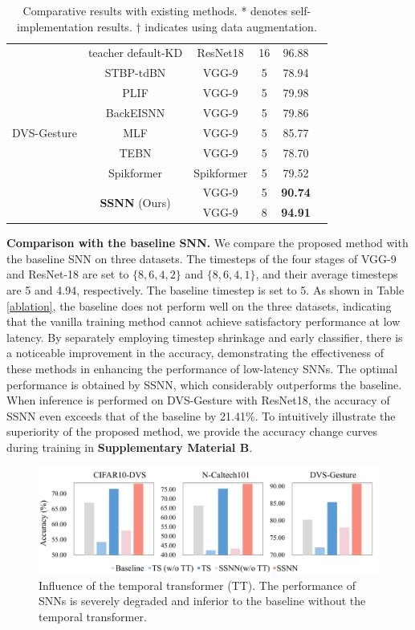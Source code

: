 \documentclass[letterpaper]{article} %
\begin{document}
\begin{table}[!tb]
\begin{threeparttable}
\begin{tabular}{cccccc}
  \hline
  \multirow{9}{*}{DVS-Gesture}
  &teacher default-KD \cite{KD} & ResNet18 & 16 & 96.88 \\
  \cline{2-5}
  & STBP-tdBN \cite{tdBN_2021} & VGG-9\tnote{*} & 5 & 78.94 \\
  & PLIF \cite{PLIF} & VGG-9\tnote{*} & 5 & 79.98 \\
  & BackEISNN \cite{BackEISNN} & VGG-9\tnote{*} & 5 & 79.86 \\
  & MLF \cite{MLF} & VGG-9\tnote{*} & 5 & 85.77 \\
  & TEBN \cite{TEBN} & VGG-9\tnote{*} & 5 & 78.70 \\
  &Spikformer \cite{Spikformer} & Spikformer\tnote{*} & 5 & 79.52 \\
  \cline{2-5}
  &\multirow{2}{*}{\textbf{SSNN} (Ours)}  & VGG-9 & 5 & \textbf{90.74} \\&& VGG-9 & 8 & \textbf{94.91}\\
  \bottomrule
 \end{tabular}
\end{threeparttable}
\caption{Comparative results with existing methods. * denotes self-implementation results. $\dag$ indicates using data augmentation.}
 \label{comparative }
\end{table}
\textbf{Comparison with the baseline SNN.} We compare the proposed method with the baseline SNN on three datasets. The timesteps of the four stages of VGG-9 and ResNet-18 are set to $\{8,6,4,2\}$ and $\{8,6,4,1\}$, and their average timesteps are 5 and 4.94, respectively. The baseline timestep is set to 5. As shown in Table \ref{ablation}, the baseline does not perform well on the three datasets, indicating that the vanilla training method cannot achieve satisfactory performance at low latency. By separately employing timestep shrinkage and early classifier, there is a noticeable improvement in the accuracy, demonstrating the effectiveness of these methods in enhancing the performance of low-latency SNNs. The optimal performance is obtained by SSNN, which considerably outperforms the baseline. When inference is performed on DVS-Gesture with ResNet18, the accuracy of SSNN even exceeds that of the baseline by 21.41\%. To intuitively illustrate the superiority of the proposed method, we provide the accuracy change curves during training in \textbf{Supplementary Material B}.


\begin{figure}[!tb]
\centering
\includegraphics[width=0.98\columnwidth]{alm}
\caption{Influence of the temporal transformer (TT). The performance of SNNs is severely degraded and inferior to the baseline without the temporal transformer.}
\label{alm}
\end{figure}
\end{document}
